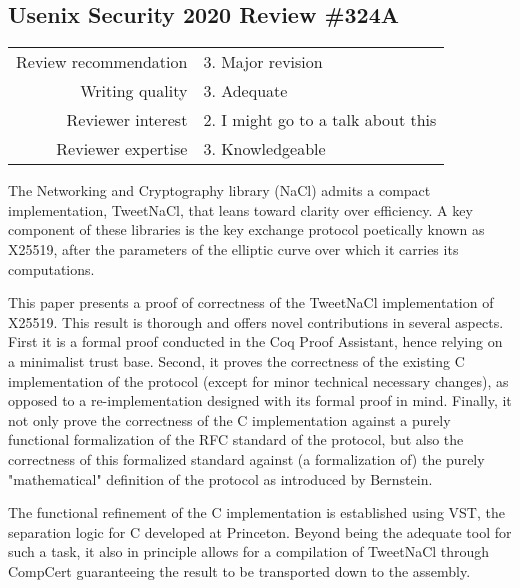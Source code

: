 \subsection{Usenix Security 2020 Review \#324A}

\begin{tabular}{rl}
    \toprule
    Review recommendation & 3. Major revision                  \\
    Writing quality       & 3. Adequate                        \\
    Reviewer interest     & 2. I might go to a talk about this \\
    Reviewer expertise    & 3. Knowledgeable                   \\
    \bottomrule
\end{tabular}




\begin{center}
\end{center}

The Networking and Cryptography library (NaCl) admits a compact implementation,
TweetNaCl, that leans toward clarity over efficiency.
A key component of these libraries is the key exchange protocol poetically known
as X25519, after the parameters of the elliptic curve over which it carries its
computations.

This paper presents a proof of correctness of the TweetNaCl implementation of X25519.
This result is thorough and offers novel contributions in several aspects.
First it is a formal proof conducted in the Coq Proof Assistant, hence relying on a
minimalist trust base.
Second, it proves the correctness of the existing C implementation of the protocol
(except for minor technical necessary changes), as opposed to a re-implementation
designed with its formal proof in mind.
Finally, it not only prove the correctness of the C implementation against a
purely functional formalization of the RFC standard of the protocol, but also
the correctness of this formalized standard against (a formalization of) the purely
"mathematical" definition of the protocol as introduced by Bernstein.

The functional refinement of the C implementation is established using VST,
the separation logic for C developed at Princeton. Beyond being the adequate
tool for such a task, it also in principle allows for a compilation of TweetNaCl
through CompCert guaranteeing the result to be transported down to the assembly.


